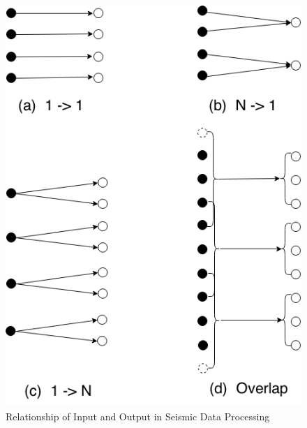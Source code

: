 \begin{figure}[H]
\centering
\includegraphics[scale=.50]{figures/template.png}
\caption{Relationship of Input and Output in Seismic Data Processing}
\label{Template}
\end{figure}


